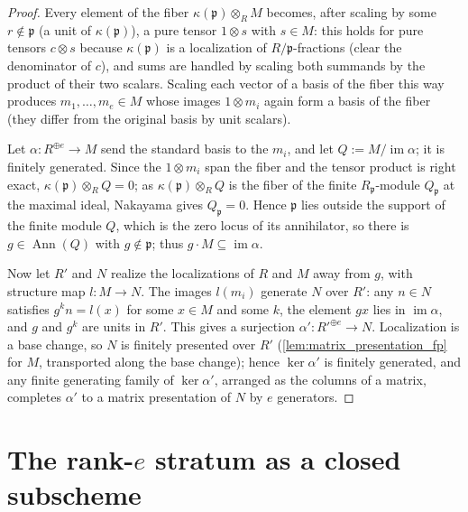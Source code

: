 \begin{proof}
  \leanok
  Every element of the fiber \(\kappa(\mathfrak p) \otimes_R M\) becomes,
  after scaling by some \(r \notin \mathfrak p\) (a unit of
  \(\kappa(\mathfrak p)\)), a pure tensor \(1 \otimes s\) with \(s \in M\):
  this holds for pure tensors \(c \otimes s\) because
  \(\kappa(\mathfrak p)\) is a localization of \(R/\mathfrak p\)-fractions
  (clear the denominator of \(c\)), and sums are handled by scaling both
  summands by the product of their two scalars.  Scaling each vector of a
  basis of the fiber this way produces \(m_1, \dots, m_e \in M\) whose
  images \(1 \otimes m_i\) again form a basis of the fiber (they differ from
  the original basis by unit scalars).

  Let \(\alpha : R^{\oplus e} \to M\) send the standard basis to the
  \(m_i\), and let \(Q := M / \operatorname{im} \alpha\); it is finitely
  generated.  Since the \(1 \otimes m_i\) span the fiber and the tensor
  product is right exact, \(\kappa(\mathfrak p) \otimes_R Q = 0\); as
  \(\kappa(\mathfrak p) \otimes_R Q\) is the fiber of the finite
  \(R_{\mathfrak p}\)-module \(Q_{\mathfrak p}\) at the maximal ideal,
  Nakayama gives \(Q_{\mathfrak p} = 0\).  Hence \(\mathfrak p\) lies
  outside the support of the finite module \(Q\), which is the zero locus
  of its annihilator, so there is \(g \in \operatorname{Ann}(Q)\) with
  \(g \notin \mathfrak p\); thus \(g \cdot M \subseteq
  \operatorname{im} \alpha\).

  Now let \(R'\) and \(N\) realize the localizations of \(R\) and \(M\)
  away from \(g\), with structure map \(l : M \to N\).  The images
  \(l(m_i)\) generate \(N\) over \(R'\): any \(n \in N\) satisfies
  \(g^k n = l(x)\) for some \(x \in M\) and some \(k\), the element
  \(g x\) lies in \(\operatorname{im} \alpha\), and \(g\) and \(g^k\) are
  units in \(R'\).  This gives a surjection
  \(\alpha' : R'^{\oplus e} \to N\).  Localization is a base change, so
  \(N\) is finitely presented over \(R'\)
  (\cref{lem:matrix_presentation_fp} for \(M\), transported along the base
  change); hence \(\ker \alpha'\) is finitely generated, and any finite
  generating family of \(\ker \alpha'\), arranged as the columns of a
  matrix, completes \(\alpha'\) to a matrix presentation of \(N\) by \(e\)
  generators.
\end{proof}

\section{The rank-\(e\) stratum as a closed subscheme}
\label{sec:flatstrat_rank_stratum}

